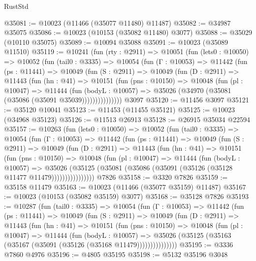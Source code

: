 \begin{lexlean}{RustStd}
\begin{coremodule}
@35081 := @10023 (@11466 (@35077 @11480) @11487)
@35082 := @34987 @35075
@35086 := @10023 (@10153 (@35082 @11480) @3077)
@35088 := @35029 (@10110 @35075)
@35089 := @10094 @35088
@35091 := @10023 (@35089 @11510)
@35119 := @10241
    (fun (rty : @2911) =>
    @10051
      (fun (lets0 : @10050) =>
      @10052
        (fun (tail0 : @3335) =>
        @10054
          (fun (Γ : @10053) =>
          @11442
            (fun (ps : @11441) =>
            @10049
              (fun (S : @2911) =>
              @10049
                (fun (D : @2911) =>
                @11443
                  (fun (hn : @41) =>
                  @10151
                    (fun (pns : @10150) =>
                    @10048
                      (fun (pl : @10047) =>
                      @11444
                        (fun (bodyL : @10057) =>
                        @35026 (@34970 (@35081 (@35086 (@35091 @35039)))))))))))))))
    @3097
@35120 := @11456 @3097
@35121 := @35120 @10041
@35123 := @11453 (@11455 @35121)
@35125 := @10023 (@34968 @35123)
@35126 := @11513 @26913
@35128 := @26915 @35034 @22594
@35157 := @10263
    (fun (lets0 : @10050) =>
    @10052
      (fun (tail0 : @3335) =>
      @10054
        (fun (Γ : @10053) =>
        @11442
          (fun (ps : @11441) =>
          @10049
            (fun (S : @2911) =>
            @10049
              (fun (D : @2911) =>
              @11443
                (fun (hn : @41) =>
                @10151
                  (fun (pns : @10150) =>
                  @10048
                    (fun (pl : @10047) =>
                    @11444
                      (fun (bodyL : @10057) =>
                      @35026
                        (@35125
                          (@35081 (@35086 (@35091 (@35126 (@35128 @11477 @11479))))))))))))))))
    @7826
@35158 := @3320 @7826
@35159 := @35158 @11479
@35163 := @10023 (@11466 (@35077 @35159) @11487)
@35167 := @10023 (@10153 (@35082 @35159) @3077)
@35168 := @35128 @7826
@35193 := @10287
    (fun (tail0 : @3335) =>
    @10054
      (fun (Γ : @10053) =>
      @11442
        (fun (ps : @11441) =>
        @10049
          (fun (S : @2911) =>
          @10049
            (fun (D : @2911) =>
            @11443
              (fun (hn : @41) =>
              @10151
                (fun (pns : @10150) =>
                @10048
                  (fun (pl : @10047) =>
                  @11444
                    (fun (bodyL : @10057) =>
                    @35026 (@35125 (@35163 (@35167 (@35091 (@35126 (@35168 @11479)))))))))))))))
@35195 := @3336 @7860 @4976
@35196 := @4805 @35195
@35198 := @5132 @35196 @3048

\end{coremodule}
\end{lexlean}
